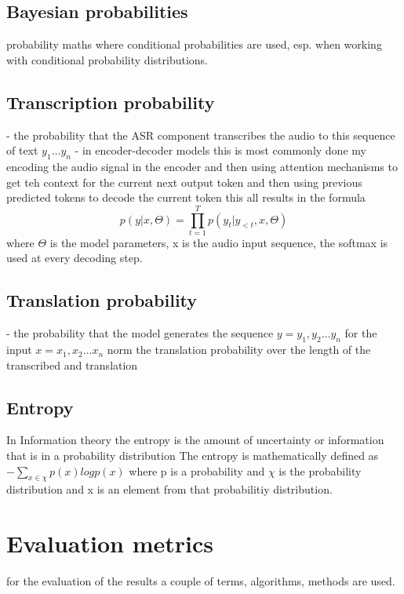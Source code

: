 \subsection{Bayesian probabilities}
probability maths where conditional probabilities are used, esp. when working with conditional probability distributions.

\subsection{Transcription probability}
- the probability that the ASR component transcribes the audio to this sequence of text $y_1\dots y_n$ 
- in encoder-decoder models this is most commonly done my encoding the audio signal in the encoder and then using attention mechanisms to get teh context for the current next output token and then using previous predicted tokens to decode the current token
this all results in the formula $$p(y|x,\Theta)=\prod_{t=1}^T p(y_t|y_{<t}, x, \Theta) $$ where $\Theta$ is the model parameters, x is the audio input sequence, the softmax is used at every decoding step.



\subsection{Translation probability}
- the probability that the model generates the sequence $y = y_1, y_2 \dots y_n$ for the input $x=x_1, x_2 \dots x_n$
norm the translation probability over the length of the transcribed and translation 



\subsection{Entropy}
\label{entropy}
In Information theory the entropy is the amount of uncertainty or information that is in a probability distribution
The entropy is mathematically defined as $- \sum_{x\in \chi} p(x) log p(x)$ where p is a probability and $\chi$ is the probability distribution and x is an element from that probabilitiy distribution.
\section{Evaluation metrics}
 for the evaluation of the results a couple of terms, algorithms, methods are used. 
 
